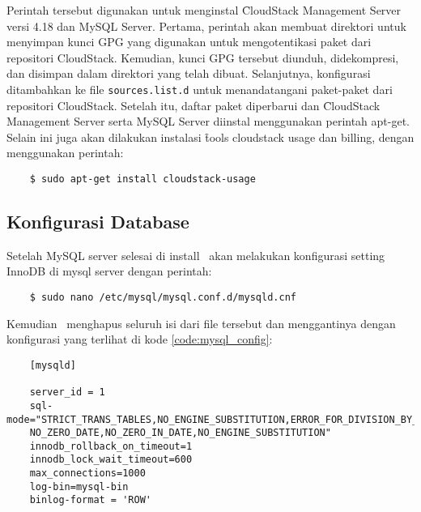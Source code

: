 Perintah tersebut digunakan untuk menginstal \f{CloudStack Management Server} versi 4.18 dan MySQL Server. Pertama, perintah akan membuat direktori untuk menyimpan kunci GPG yang digunakan untuk mengotentikasi paket dari repositori CloudStack. Kemudian, kunci GPG tersebut diunduh, didekompresi, dan disimpan dalam direktori yang telah dibuat. Selanjutnya, konfigurasi ditambahkan ke file \texttt{sources.list.d} untuk menandatangani paket-paket dari repositori CloudStack. Setelah itu, daftar paket diperbarui dan \f{CloudStack Management Server} serta MySQL Server diinstal menggunakan perintah apt-get. Selain ini juga akan dilakukan instalasi \f{tools} cloudstack usage dan billing, dengan menggunakan perintah:

\begin{listing}[H]
    \begin{verbatim}  
    $ sudo apt-get install cloudstack-usage
    \end{verbatim}
\end{listing}

\subsection{Konfigurasi Database}
Setelah MySQL server selesai di install \saya\ akan melakukan konfigurasi setting InnoDB di mysql server dengan perintah:

\begin{listing}[H]
    \begin{verbatim}      
    $ sudo nano /etc/mysql/mysql.conf.d/mysqld.cnf
    \end{verbatim}
\end{listing}

Kemudian \saya\ menghapus seluruh isi dari file tersebut dan menggantinya dengan konfigurasi yang terlihat di kode \ref{code:mysql_config}:

\begin{listing}[H]
    \begin{verbatim}
    [mysqld]

    server_id = 1
    sql-mode="STRICT_TRANS_TABLES,NO_ENGINE_SUBSTITUTION,ERROR_FOR_DIVISION_BY_ZERO
    NO_ZERO_DATE,NO_ZERO_IN_DATE,NO_ENGINE_SUBSTITUTION"
    innodb_rollback_on_timeout=1
    innodb_lock_wait_timeout=600
    max_connections=1000
    log-bin=mysql-bin
    binlog-format = 'ROW'
    \end{verbatim}
    \caption{Konfigurasi mysqld.cnf}
    \label{code:mysql_config}
\end{listing}

